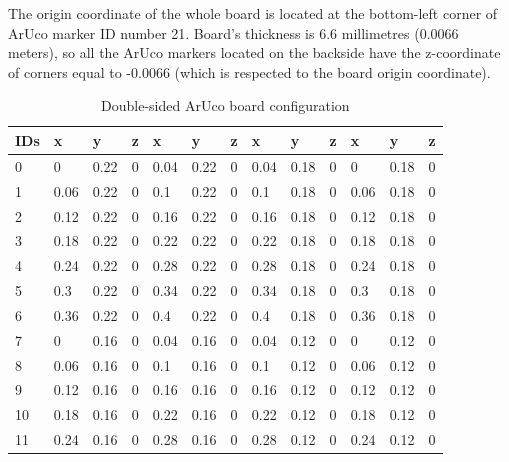 The origin coordinate of the whole board is located at the bottom-left corner of ArUco marker ID number 21. Board's thickness is 6.6 millimetres (0.0066 meters), so all the ArUco markers located on the backside have the z-coordinate of corners equal to -0.0066 (which is respected to the board origin coordinate).

\clearpage
\begin{footnotesize}
\begin{longtable}{|l|l|l|l|l|l|l|l|l|l|l|l|l|}
\caption{\normalsize \label{tab:boardconfig}Double-sided ArUco board configuration} \\
\hline
IDs & x    & y    & z       & x    & y    & z       & x    & y    & z       & x    & y    & z       \\ \hline
\endfirsthead
\endhead
%
0   & 0    & 0.22 & 0       & 0.04 & 0.22 & 0       & 0.04 & 0.18 & 0       & 0    & 0.18 & 0       \\ \hline
1   & 0.06 & 0.22 & 0       & 0.1  & 0.22 & 0       & 0.1  & 0.18 & 0       & 0.06 & 0.18 & 0       \\ \hline
2   & 0.12 & 0.22 & 0       & 0.16 & 0.22 & 0       & 0.16 & 0.18 & 0       & 0.12 & 0.18 & 0       \\ \hline
3   & 0.18 & 0.22 & 0       & 0.22 & 0.22 & 0       & 0.22 & 0.18 & 0       & 0.18 & 0.18 & 0       \\ \hline
4   & 0.24 & 0.22 & 0       & 0.28 & 0.22 & 0       & 0.28 & 0.18 & 0       & 0.24 & 0.18 & 0       \\ \hline
5   & 0.3  & 0.22 & 0       & 0.34 & 0.22 & 0       & 0.34 & 0.18 & 0       & 0.3  & 0.18 & 0       \\ \hline
6   & 0.36 & 0.22 & 0       & 0.4  & 0.22 & 0       & 0.4  & 0.18 & 0       & 0.36 & 0.18 & 0       \\ \hline
7   & 0    & 0.16 & 0       & 0.04 & 0.16 & 0       & 0.04 & 0.12 & 0       & 0    & 0.12 & 0       \\ \hline
8   & 0.06 & 0.16 & 0       & 0.1  & 0.16 & 0       & 0.1  & 0.12 & 0       & 0.06 & 0.12 & 0       \\ \hline
9   & 0.12 & 0.16 & 0       & 0.16 & 0.16 & 0       & 0.16 & 0.12 & 0       & 0.12 & 0.12 & 0       \\ \hline
10  & 0.18 & 0.16 & 0       & 0.22 & 0.16 & 0       & 0.22 & 0.12 & 0       & 0.18 & 0.12 & 0       \\ \hline
11  & 0.24 & 0.16 & 0       & 0.28 & 0.16 & 0       & 0.28 & 0.12 & 0       & 0.24 & 0.12 & 0       \\ \hline

\end{longtable}
\end{footnotesize}
